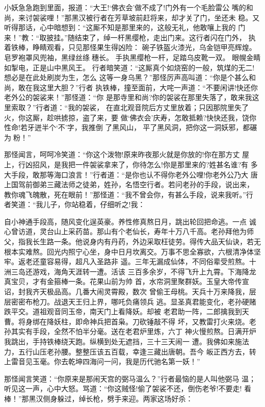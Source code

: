 小妖急急跑到里面，报道：“大王!‘佛衣会’做不成了!门外有一个毛脸雷公
嘴的和尚，来讨袈裟哩！”那黑汉被行者在芳草坡前赶将来，却才关了门，坐还未
稳。又听得那话，心中暗想到：“这厮不知是那里来的，这般无礼，他敢嚷上我的
门来！”教：“取披挂。”随结束了，绰一杆黑缨枪，走出门来。这行者闪在门外，
执着铁棒，睁睛观看，只见那怪果生得凶险：
碗子铁盔火漆光，乌金铠甲亮辉煌。
皂罗袍罩风兜袖，黑绿丝绦穗长。
手执黑缨枪一杆，足踏乌皮靴一双。
眼幌金睛如掣电，正是山中黑风王。
行者暗笑道：“这厮真个如烧窑的一般，筑煤的无二!想必是在此处刷炭为生，怎么
这等一身乌黑？”那怪厉声高叫道：“你是个甚么和尚，敢在我这里大胆？”行者
执铁棒，撞至面前，大咤一声道：“不要闲讲!快还你老外公的袈裟来！”那怪道：“你
是那寺里和尚?你的袈裟在那里失落了，敢来我这里索取？”行者道：“我的袈裟，
在直北观音院后方丈里放着；只因那院里失了火，你这厮，趁哄掳掠，盗了来，要
做‘佛衣会’庆寿，怎敢抵赖?快快还我，饶你性命!若牙迸半个‘不’字，我推倒
了黑风山，平了黑风洞，把你这一洞妖邪，都碾为粉！”

那怪闻言，呵呵冷笑道：“你这个泼物!原来昨夜那火就是你放的!你在那方丈
屋上，行凶招风，是我把一件袈裟拿来了，你待怎么!你是那里来的?姓甚名谁?有
多大手段，敢那等海口浪言！”行者道：“是你也认不得你老外公哩!你老外公乃大
唐上国驾前御弟三藏法师之徒弟，姓孙，名悟空行者。若问老孙的手段，说出来，
教你魂飞魄散，死在眼前！”那怪道：“我不曾会你，有甚么手段，说来我听。”行
者笑道：“我儿子，你站稳着，仔细听之!我：

自小神通手段高，随风变化逞英豪。养性修真熬日月，跳出轮回把命逃。一点
诚心曾访道，灵台山上采药苗。那山有个老仙长，寿年十万八千高。老孙拜他为师
父，指我长生路一条。他说身内有丹药，外边采取枉徒劳。得传大品天仙诀，若无
根本实难熬。回光内照宁心坐，身中日月坎离交。万事不思全寡欲，六根清净体坚
牢。返老还童容易得，超凡入圣路非
遥。三年无漏成仙体，不同俗辈受煎熬。十洲三岛还游戏，海角天涯转一遭。活该
三百多余岁，不得飞升上九霄。下海降龙真宝贝，才有金箍棒一条。花果山前为帅
首，水帘洞里聚群妖。玉皇大帝传宣诏，封我齐天极品高。几番大闹灵霄殿，数次
曾偷王母桃。天兵十万来降我，层层密密布枪刀。战退天王归上界，哪吒负痛领兵
逃。显圣真君能变化，老孙硬赌跌平交。道祖观音同玉帝，南天门上看降妖。却被
老君助一阵，二郎擒我到天曹。将身绑在降妖柱，即命神兵把首枭。刀砍锤敲不得
坏，又教雷打火来烧。老孙其实有手段，全然不怕半分毫。送在老君炉里炼，六丁
神火慢煎熬。日满开炉我跳出，手持铁棒绕天跑。纵横到处无遮挡，三十三天闹一
遭。我佛如来施法力，五行山压老孙腰。整整压该五百载，幸逢三藏出唐朝。吾今
皈正西方去，转上雷音见玉毫。你去乾坤四海问一问，我是历代驰名第一妖！”

那怪闻言笑道：“你原来是那闹天宫的弼马温么？”行者最恼的是人叫他弼马
温；听见这一声，心中大怒。骂道：“你这贼怪!偷了袈裟不还，倒伤老爷!不要走!
看棒！”那黑汉侧身躲过，绰长枪，劈手来迎。两家这场好杀：

